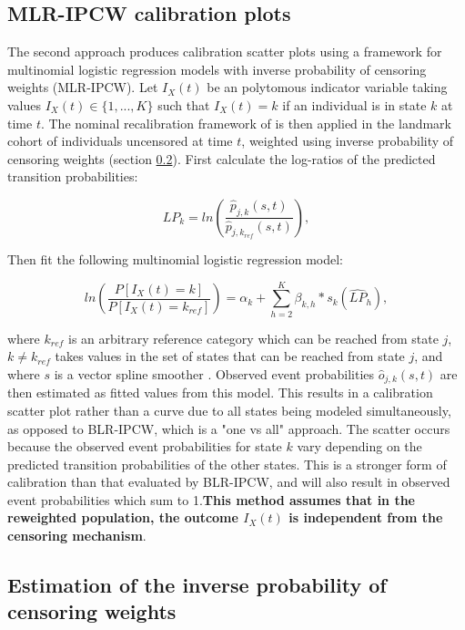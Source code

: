 \documentclass[article,shortnames]{jss}
\begin{document}
\subsection{MLR-IPCW calibration plots} \label{sec:mlripcw}

The second approach produces calibration scatter plots using a framework for multinomial logistic regression models with inverse probability of censoring weights (MLR-IPCW). Let $I_{X}(t)$ be an polytomous indicator variable taking values $I_{X}(t) \in \{1, ..., K\}$ such that $I_{X}(t) = k$ if an individual is in state $k$ at time $t$. The nominal recalibration framework of \cite{VanHoorde2014, VanHoorde2015} is then applied in the landmark cohort of individuals uncensored at time $t$, weighted using inverse probability of censoring weights (section \ref{sec:weights}).  First calculate the log-ratios of the predicted transition probabilities:

$$\hat{LP}_{k} = ln\left(\frac{\hat{p}_{j, k}(s, t)}{\hat{p}_{j, k_{ref}}(s, t)}\right),$$

Then fit the following multinomial logistic regression model:

\begin{equation}\label{eq:mlr}
  ln\left(\frac{P[I_{X}(t) = k]}{P[I_{X}(t) = k_{ref}]}\right) = \alpha_{k} + \sum_{h=2}^{K} \beta_{k,h}*s_{k}(\hat{LP}_{h}),
\end{equation}

where $k_{ref}$ is an arbitrary reference category which can be reached from state $j$, $k \neq k_{ref}$ takes values in the set of states that can be reached from state $j$, and where $s$ is a vector spline smoother \citep{Yee2015}. Observed event probabilities $\hat{o}_{j,k}(s,t)$ are then estimated as fitted values from this model. This results in a calibration scatter plot rather than a curve due to all states being modeled simultaneously, as opposed to BLR-IPCW, which is a "one vs all" approach. The scatter occurs because the observed event probabilities for state $k$ vary depending on the predicted transition probabilities of the other states. This is a stronger \citep{VanCalster2016} form of calibration than that evaluated by BLR-IPCW, and will also result in observed event probabilities which sum to 1.\textbf{This method assumes that in the reweighted population, the outcome $I_{X}(t)$ is independent from the censoring mechanism}.

\subsection{Estimation of the inverse probability of censoring weights} \label{sec:weights}
\end{document}
